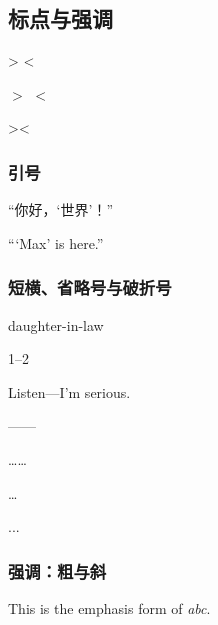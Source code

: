 \documentclass{ctexart}
\begin{document}
    \subsection{标点与强调}
            > < 
            
            $>$ $<$ 
            
            \textgreater \textless 
        
            \subsubsection{引号}
            “你好，‘世界’！” 
            
            ``\thinspace`Max' is here.'' 
    
        \subsubsection{短横、省略号与破折号}
            daughter-in-law

            1--2
            
            Listen---I'm serious.
        
            ——
            
            ……
            
            \ldots
            
            ...

	    \subsubsection{强调：粗与斜}
            This is the emphasis form of \emph{abc}.
    
\end{document}
